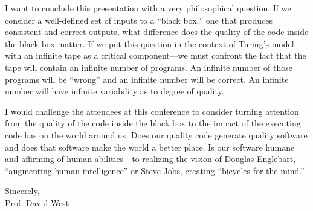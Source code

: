 I want to conclude this presentation with a very philosophical question.
If we consider a well-defined set of inputs to a ``black box,'' one that produces consistent and correct outputs, what difference does the quality of the code inside the black box matter. If we put this question in the context of Turing's model with an infinite tape as a critical component---we must confront the fact that the tape will contain an infinite number of programs. An infinite number of those programs will be ``wrong'' and an infinite number will be correct. An infinite number will have infinite variability as to degree of quality.

I would challenge the attendees at this conference to consider turning attention from the quality of the code inside the black box to the impact of the executing code has on the world around us. Does our quality code generate quality software and does that software make the world a better place. Is our software humane and affirming of human abilities---to realizing the vision of Douglas Englebart, ``augmenting human intelligence'' or Steve Jobs, creating ``bicycles for the mind.''

\vspace{18pt}
Sincerely,\\
Prof. David West\\
